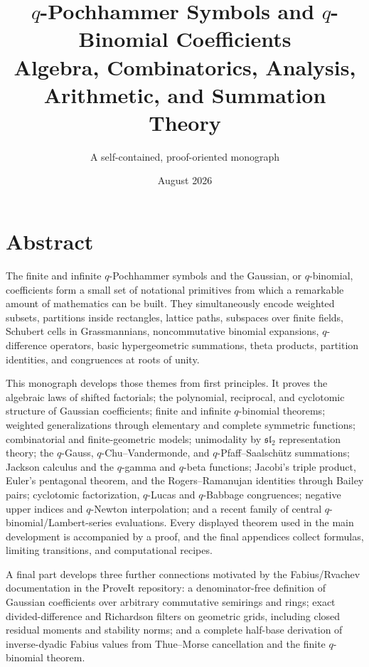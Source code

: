 \documentclass[11pt,oneside,openany]{book}
\title{\Huge\bfseries $q$-Pochhammer Symbols and $q$-Binomial Coefficients\\[8pt]
\Large Algebra, Combinatorics, Analysis, Arithmetic, and Summation Theory}
\author{A self-contained, proof-oriented monograph}
\date{August 2026}
\theoremstyle{definition}
\theoremstyle{remark}
\begin{document}
\frontmatter
\hypersetup{pageanchor=false}
\maketitle
\hypersetup{pageanchor=true}

\chapter*{Abstract}
The finite and infinite $q$-Pochhammer symbols and the Gaussian, or $q$-binomial, coefficients form a small set of notational primitives from which a remarkable amount of mathematics can be built.  They simultaneously encode weighted subsets, partitions inside rectangles, lattice paths, subspaces over finite fields, Schubert cells in Grassmannians, noncommutative binomial expansions, $q$-difference operators, basic hypergeometric summations, theta products, partition identities, and congruences at roots of unity.

This monograph develops those themes from first principles.  It proves the algebraic laws of shifted factorials; the polynomial, reciprocal, and cyclotomic structure of Gaussian coefficients; finite and infinite $q$-binomial theorems; weighted generalizations through elementary and complete symmetric functions; combinatorial and finite-geometric models; unimodality by $\mathfrak{sl}_2$ representation theory; the $q$-Gauss, $q$-Chu--Vandermonde, and $q$-Pfaff--Saalsch\"utz summations; Jackson calculus and the $q$-gamma and $q$-beta functions; Jacobi's triple product, Euler's pentagonal theorem, and the Rogers--Ramanujan identities through Bailey pairs; cyclotomic factorization, $q$-Lucas and $q$-Babbage congruences; negative upper indices and $q$-Newton interpolation; and a recent family of central $q$-binomial/Lambert-series evaluations.  Every displayed theorem used in the main development is accompanied by a proof, and the final appendices collect formulas, limiting transitions, and computational recipes.

A final part develops three further connections motivated by the Fabius/Rvachev documentation in the ProveIt repository: a denominator-free definition of Gaussian coefficients over arbitrary commutative semirings and rings; exact divided-difference and Richardson filters on geometric grids, including closed residual moments and stability norms; and a complete half-base derivation of inverse-dyadic Fabius values from Thue--Morse cancellation and the finite $q$-binomial theorem.
\end{document}
